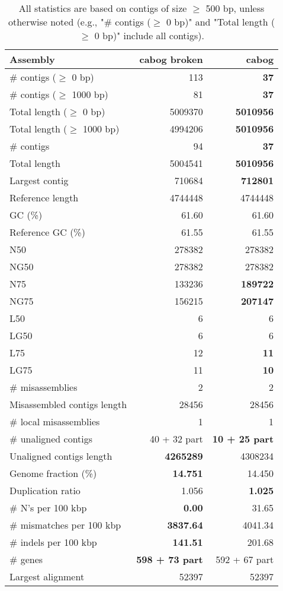 \documentclass[12pt,a4paper]{article}
\begin{document}
\begin{table}[ht]
\begin{center}
\caption{All statistics are based on contigs of size $\geq$ 500 bp, unless otherwise noted (e.g., "\# contigs ($\geq$ 0 bp)" and "Total length ($\geq$ 0 bp)" include all contigs).}
\begin{tabular}{|l*{2}{|r}|}
\hline
Assembly & cabog broken & cabog \\ \hline
\# contigs ($\geq$ 0 bp) & 113 & {\bf 37} \\ \hline
\# contigs ($\geq$ 1000 bp) & 81 & {\bf 37} \\ \hline
Total length ($\geq$ 0 bp) & 5009370 & {\bf 5010956} \\ \hline
Total length ($\geq$ 1000 bp) & 4994206 & {\bf 5010956} \\ \hline
\# contigs & 94 & {\bf 37} \\ \hline
Total length & 5004541 & {\bf 5010956} \\ \hline
Largest contig & 710684 & {\bf 712801} \\ \hline
Reference length & 4744448 & 4744448 \\ \hline
GC (\%) & 61.60 & 61.60 \\ \hline
Reference GC (\%) & 61.55 & 61.55 \\ \hline
N50 & 278382 & 278382 \\ \hline
NG50 & 278382 & 278382 \\ \hline
N75 & 133236 & {\bf 189722} \\ \hline
NG75 & 156215 & {\bf 207147} \\ \hline
L50 & 6 & 6 \\ \hline
LG50 & 6 & 6 \\ \hline
L75 & 12 & {\bf 11} \\ \hline
LG75 & 11 & {\bf 10} \\ \hline
\# misassemblies & 2 & 2 \\ \hline
Misassembled contigs length & 28456 & 28456 \\ \hline
\# local misassemblies & 1 & 1 \\ \hline
\# unaligned contigs & 40 + 32 part & {\bf 10 + 25 part} \\ \hline
Unaligned contigs length & {\bf 4265289} & 4308234 \\ \hline
Genome fraction (\%) & {\bf 14.751} & 14.450 \\ \hline
Duplication ratio & 1.056 & {\bf 1.025} \\ \hline
\# N's per 100 kbp & {\bf 0.00} & 31.65 \\ \hline
\# mismatches per 100 kbp & {\bf 3837.64} & 4041.34 \\ \hline
\# indels per 100 kbp & {\bf 141.51} & 201.68 \\ \hline
\# genes & {\bf 598 + 73 part} & 592 + 67 part \\ \hline
Largest alignment & 52397 & 52397 \\ \hline
\end{tabular}
\end{center}
\end{table}
\end{document}
